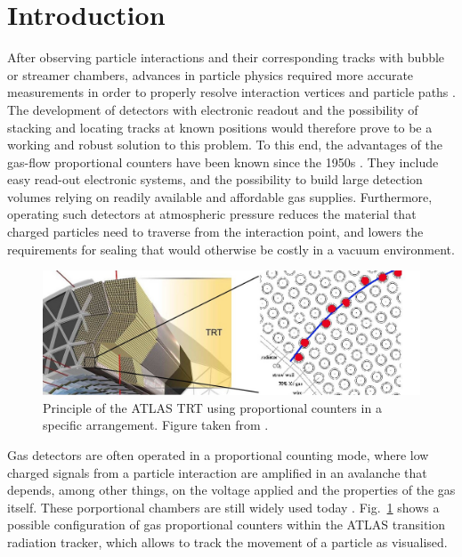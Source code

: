 \section{Introduction}  \label{sec:Introduction}
After observing particle interactions and their corresponding tracks with
bubble or streamer chambers, advances in particle physics required more accurate measurements in order to properly resolve interaction vertices and particle paths \cite{charpak_high-resolution_1984}. The development of detectors with electronic readout and the possibility of stacking and locating tracks at known positions would therefore
prove to be a working and robust solution to this problem. To this end, the advantages of
the gas-flow proportional counters have been known since the 1950s \cite{hendee_gasflow_1956}. They include easy read-out electronic systems, and the possibility to build large detection volumes relying on readily available and affordable gas supplies. Furthermore, operating such detectors at atmospheric pressure reduces the material that charged particles need to traverse from the interaction point, and lowers the requirements for sealing that would otherwise be costly in a vacuum environment.

\begin{figure}[htb]
  \includegraphics[width=\linewidth]{graphics/ATLAS_TRT_Principle_image}
  \caption{Principle of the ATLAS TRT using proportional counters in a specific
    arrangement. Figure taken from \cite{colliderscope}.}
  \label{fig:colliderscope}
\end{figure}

Gas detectors are often operated in a proportional counting mode, where low charged signals from a particle interaction are amplified in an avalanche that depends, among other things, on the voltage applied and the properties of the gas itself. These porportional chambers are still widely used today \cite{Mindur:2017nqn}. Fig.~\ref{fig:colliderscope} shows a possible configuration of gas proportional counters within the ATLAS transition radiation tracker, which allows to track the movement of a particle as visualised.

